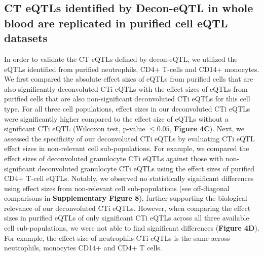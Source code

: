 \subsection{CT eQTLs identified by Decon-eQTL in whole blood are replicated in purified cell eQTL datasets}
In order to validate the CT eQTLs defined by decon-eQTL, we utilized the eQTLs identified from purified neutrophils, CD4+ T-cells and CD14+ monocytes\cite{chenGeneticDriversEpigenetic2016}. We first compared the absolute effect sizes of eQTLs from purified cells that are also significantly deconvoluted CTi eQTLs with the effect sizes of eQTLs from purified cells that are also non-significant deconvoluted CTi eQTLs for this cell type. For all three cell populations, effect sizes in our deconvoluted CTi eQTLs were significantly higher compared to the effect size of eQTLs without a significant CTi eQTL (Wilcoxon test, p-value $\leq 0.05$, \textbf{Figure 4C}). Next, we assessed the specificity of our deconvoluted CTi eQTLs by evaluating CTi eQTL effect sizes in non-relevant cell sub-populations. For example, we compared the effect sizes of deconvoluted granulocyte CTi eQTLs against those with non-significant deconvoluted granulocyte CTi eQTLs using the effect sizes of purified CD4+ T-cell eQTLs. Notably, we observed no statistically significant differences using effect sizes from non-relevant cell sub-populations (see off-diagonal comparisons in \textbf{Supplementary Figure 8}), further supporting the biological relevance of our deconvoluted CTi eQTLs. However, when comparing the effect sizes in purified eQTLs of only significant CTi eQTLs across all three available cell sub-populations, we were not able to find significant differences (\textbf{Figure 4D}). For example, the effect size of neutrophils CTi eQTLs is the same across neutrophils, monocytes CD14+ and CD4+ T cells.

